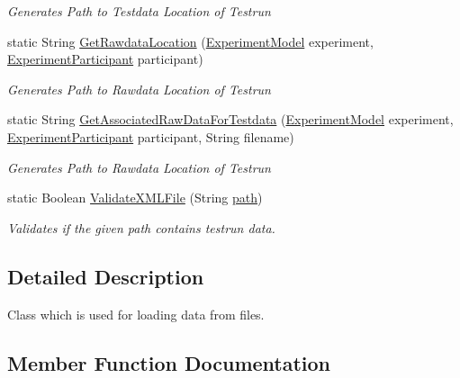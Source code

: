 \begin{DoxyCompactItemize}
\begin{DoxyCompactList}\small\item\em Generates Path to Testdata Location of Testrun \end{DoxyCompactList}\item 
static String \hyperlink{class_web_analyzer_1_1_controller_1_1_load_controller_aa61685fae8eaeda3915c7cab8ddfd837}{Get\+Rawdata\+Location} (\hyperlink{class_web_analyzer_1_1_models_1_1_base_1_1_experiment_model}{Experiment\+Model} experiment, \hyperlink{class_web_analyzer_1_1_models_1_1_base_1_1_experiment_participant}{Experiment\+Participant} participant)
\begin{DoxyCompactList}\small\item\em Generates Path to Rawdata Location of Testrun \end{DoxyCompactList}\item 
static String \hyperlink{class_web_analyzer_1_1_controller_1_1_load_controller_a2c83ce274c328d5115152e09e0d32e56}{Get\+Associated\+Raw\+Data\+For\+Testdata} (\hyperlink{class_web_analyzer_1_1_models_1_1_base_1_1_experiment_model}{Experiment\+Model} experiment, \hyperlink{class_web_analyzer_1_1_models_1_1_base_1_1_experiment_participant}{Experiment\+Participant} participant, String filename)
\begin{DoxyCompactList}\small\item\em Generates Path to Rawdata Location of Testrun \end{DoxyCompactList}\item 
static Boolean \hyperlink{class_web_analyzer_1_1_controller_1_1_load_controller_a1ef9f09d7997062e6c84ebd1b99f588f}{Validate\+X\+M\+L\+File} (String \hyperlink{bin_2x64_2_release_2_u_i_2_h_t_m_l_resources_2js_2src_2create__experiment_8js_aa72e0c8a20e6bcc571d3a1c51846e627}{path})
\begin{DoxyCompactList}\small\item\em Validates if the given path contains testrun data. \end{DoxyCompactList}\end{DoxyCompactItemize}


\subsection{Detailed Description}
Class which is used for loading data from files. 



\subsection{Member Function Documentation}
\hypertarget{class_web_analyzer_1_1_controller_1_1_load_controller_a2c83ce274c328d5115152e09e0d32e56}{}
